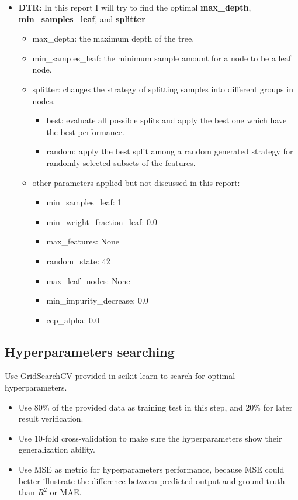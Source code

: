 \documentclass[a4paper]{article}
\begin{document}
\begin{itemize}
    \item \textbf{DTR}: In this report I will try to find the optimal \textbf{max\_depth}, \textbf{min\_samples\_leaf}, and \textbf{splitter}
    \begin{itemize}
        \item max\_depth: the maximum depth of the tree.
        \item min\_samples\_leaf: the minimum sample amount for a node to be a leaf node.
        \item splitter: changes the strategy of splitting samples into different groups in nodes.
        \begin{itemize}
            \item best: evaluate all possible splits and apply the best one which have the best performance.
            \item random: apply the best split among a random generated strategy for randomly selected subsets of the features.
        \end{itemize}
        \item other parameters applied but not discussed in this report: 
        \begin{itemize}
            \item min\_samples\_leaf: 1
            \item min\_weight\_fraction\_leaf: 0.0
            \item max\_features: None
            \item random\_state: 42
            \item max\_leaf\_nodes: None
            \item min\_impurity\_decrease: 0.0
            \item ccp\_alpha: 0.0
        \end{itemize}
    \end{itemize}
\end{itemize}

\subsection{Hyperparameters searching}

\label{sec:HyperparametersSearching}

Use GridSearchCV provided in scikit-learn to search for optimal hyperparameters.

\begin{itemize}
    \item Use 80\% of the provided data as training test in this step, and 20\% for later result verification.
    \item Use 10-fold cross-validation to make sure the hyperparameters show their generalization ability.
    \item Use MSE as metric for hyperparameters performance, because MSE could better illustrate the difference between predicted output and ground-truth than $R^2$ or MAE.
\end{itemize}
\end{document}
